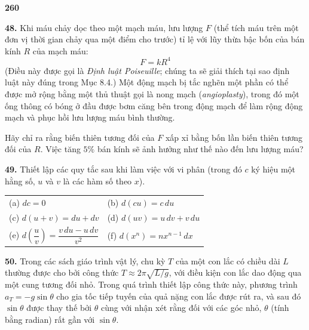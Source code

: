 \pagestyle{empty}
\fontsize{9.5pt}{12pt}\selectfont

\noindent
{\bfseries 260}
\vspace{12pt}

\noindent
\begin{minipage}[t]{0.33\textwidth}
  \textbf{48.} Khi máu chảy dọc theo một mạch máu, lưu lượng $F$ (thể tích máu trên một đơn vị thời gian chảy qua một điểm cho trước) tỉ lệ với lũy thừa bậc bốn của bán kính $R$ của mạch máu:
  \[
    F = kR^4
  \]
  (Điều này được gọi là \emph{Định luật Poiseuille}; chúng ta sẽ giải thích tại sao định luật này đúng trong Mục 8.4.) Một động mạch bị tắc nghẽn một phần có thể được mở rộng bằng một thủ thuật gọi là nong mạch (\emph{angioplasty}), trong đó một ống thông có bóng ở đầu được bơm căng bên trong động mạch để làm rộng động mạch và phục hồi lưu lượng máu bình thường.
  \par\vspace{3pt}
  Hãy chỉ ra rằng biến thiên tương đối của $F$ xấp xỉ bằng bốn lần biến thiên tương đối của $R$. Việc tăng $5\%$ bán kính sẽ ảnh hưởng như thế nào đến lưu lượng máu?

  \vspace{10pt}
  \textbf{49.} Thiết lập các quy tắc sau khi làm việc với vi phân (trong đó $c$ ký hiệu một hằng số, $u$ và $v$ là các hàm số theo $x$).\vspace{3pt}

  \noindent
  \begin{tabularx}{\linewidth}{@{}X X@{}}
    (a) $dc = 0$ & (b) $d(cu) = c\,du$ \\[4pt]
    (c) $d(u + v) = du + dv$ & (d) $d(uv) = u\,dv + v\,du$ \\[4pt]
    (e) $d\left(\dfrac{u}{v}\right) = \dfrac{v\,du - u\,dv}{v^2}$ & (f) $d(x^n) = n x^{n-1}\,dx$
  \end{tabularx}

  \vspace{10pt}
  \textbf{50.} Trong các sách giáo trình vật lý, chu kỳ $T$ của một con lắc có chiều dài $L$ thường được cho bởi công thức $T \approx 2\pi\sqrt{L/g}$, với điều kiện con lắc dao động qua một cung tương đối nhỏ. Trong quá trình thiết lập công thức này, phương trình $a_T = -g\sin\theta$ cho gia tốc tiếp tuyến của quả nặng con lắc được rút ra, và sau đó $\sin\theta$ được thay thế bởi $\theta$ cùng với nhận xét rằng đối với các góc nhỏ, $\theta$ (tính bằng radian) rất gần với $\sin\theta$.
\end{minipage}%
